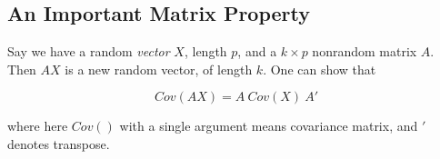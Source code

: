 \subsection{An Important Matrix Property}

Say we have a random \textit{vector} $X$, length $p$, and a $k \times p$
nonrandom matrix $A$.  Then $AX$ is a new random vector, of length $k$.
One can show that

\begin{equation}
Cov(AX) = A ~ Cov(X) ~ A'
\end{equation}

where here $Cov()$ with a single argument means covariance matrix, and
$'$ denotes transpose.

